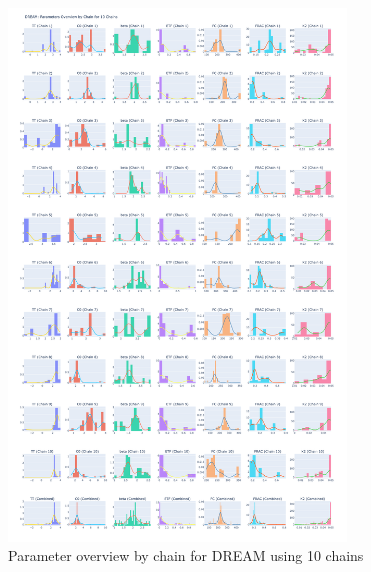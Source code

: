 \begin{figure}[H]
    \centering
    \includegraphics[width=0.8\textwidth]{figures/dream/param_overview_10.png}
    \captionsetup{width=.8\textwidth}
    \caption{Parameter overview by chain for DREAM using 10 chains}
    \label{fig:enter-label}
\end{figure}


